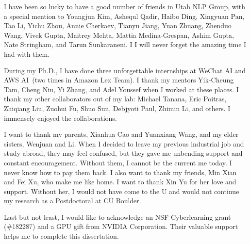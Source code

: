 I have been so lucky to have a good number of friends in Utah NLP
Group, with a special mention to Youngjun Kim, Ashequl Qadir, Haibo
Ding, Xingyuan Pan, Tao Li, Yichu Zhou, Annie Cherkaev, Tianyu Jiang,
Yuan Zhuang, Zhenduo Wang, Vivek Gupta, Maitrey Mehta, Mattia
Medina-Grespan, Ashim Gupta, Nate Stringham, and Tarun Sunkaraneni. I
I will never forget the amazing time I had with them.

During my Ph.D., I have done three unforgettable internships at WeChat
AI and AWS AI~(two times in Amazon Lex Team). I thank my mentors
Yik-Cheung Tam, Cheng Niu, Yi Zhang, and Adel Youssef when I worked at
these places. I thank my other collaborators out of my lab: Michael
Tanana, Eric Poitras, Zhiqiang Liu, Zuohui Fu, Shuo Sun, Debjyoti
Paul, Zhimin Li, and others. I immensely enjoyed the collaborations.


I want to thank my parents, Xianhua Cao and Yuanxiang Wang, and my
elder sisters, Wenjuan and Li. When I decided to leave my previous
industrial job and study abroad, they may feel confused, but they gave
me unbending support and constant encouragement. Without them, I
cannot be the current me today. I never know how to pay them back. I
also want to thank my friends, Min Xian and Fei Xu, who make me like
home. I want to thank Xin Yu for her love and support. Without her, I
would not have come to the U and would not continue my research as a
Postdoctoral at CU Boulder.

Last but not least, I would like to acknowledge an NSF Cyberlearning
grant (\#182287) and a GPU gift from NVIDIA Corporation. Their
valuable support helps me to complete this dissertation.

